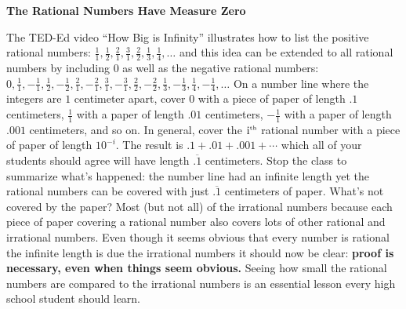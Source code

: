 \documentclass[12pt]{article}
\begin{document}
\begin{center}
\textbf{{\Large The Rational Numbers Have Measure Zero}}
\end{center}
The TED-Ed video ``How Big is Infinity'' illustrates how to list
the positive rational numbers: $\frac{1}{1}, \frac{1}{2},
\frac{2}{1}, \frac{3}{1}, \frac{2}{2}, \frac{1}{3}, \frac{1}{4},
\ldots$ and this idea can be extended to all rational numbers 
by including $0$ as well as the negative rational numbers:
$0,\frac{1}{1}, -\frac{1}{1}, \frac{1}{2}, -\frac{1}{2},
\frac{2}{1}, -\frac{2}{1}, \frac{3}{1}, -\frac{3}{1}, \frac{2}{2}, -\frac{2}{2}, \frac{1}{3}, -\frac{1}{3}, \frac{1}{4}, 
-\frac{1}{4}, \ldots$
On a number line where the integers are $1$ centimeter apart,
cover $0$ with a piece of paper of length $.1$ centimeters, 
$\frac{1}{1}$ with a paper of length $.01$ centimeters, 
$-\frac{1}{1}$ with a paper of length $.001$ centimeters, and
so on. In general, cover the $\mbox{i}^{\tiny\mbox{th}}$
rational number with a piece of paper of length $10^{-i}$. 
The result is $.1+.01+.001+\cdots$ which all of your students
should agree will have length $\overline{.1}$ centimeters. 
Stop the class to summarize what's happened: the number line
had an infinite length yet the rational numbers can be covered
with just $\overline{.1}$ centimeters of paper. What's not 
covered by the paper? Most (but not all) of the irrational numbers
because each piece of paper covering a rational number also 
covers lots of other rational and irrational numbers. Even though 
it seems obvious that every number is rational
the infinite length is due the irrational numbers it should now be 
clear: \textbf{proof is necessary, even when things seem obvious.}
Seeing how small the rational numbers are compared to the 
irrational numbers is an essential lesson every high school student 
should learn. 
\end{document}
